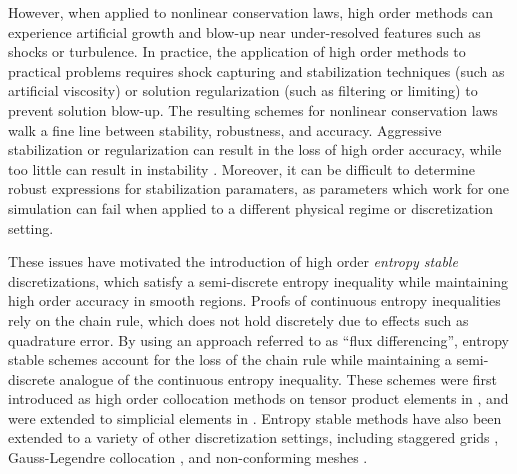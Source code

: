 \documentclass{svjour3}                     %
\begin{document}
However, when applied to nonlinear conservation laws, high order methods can experience artificial growth and blow-up near under-resolved features such as shocks or turbulence.  In practice, the application of high order methods to practical problems requires shock capturing and stabilization techniques (such as artificial viscosity) or solution regularization (such as filtering or limiting) to prevent solution blow-up.  The resulting schemes for nonlinear conservation laws walk a fine line between stability, robustness, and accuracy.  Aggressive stabilization or regularization can result in the loss of high order accuracy, while too little can result in instability \cite{wang2013high}.  Moreover, it can be difficult to determine robust expressions for stabilization paramaters, as parameters which work for one simulation can fail when applied to a different physical regime or discretization setting.  

These issues have motivated the introduction of high order \textit{entropy stable} discretizations, which satisfy a semi-discrete entropy inequality while maintaining high order accuracy in smooth regions.  Proofs of continuous entropy inequalities rely on the chain rule, which does not hold discretely due to effects such as quadrature error.   By using an approach referred to as ``flux differencing'', entropy stable schemes account for the loss of the chain rule while maintaining a semi-discrete analogue of the continuous entropy inequality.  These schemes were first introduced as high order collocation methods on tensor product elements in \cite{fisher2013high, carpenter2014entropy, gassner2016split, gassner2017br1}, and were extended to simplicial elements in \cite{crean2017high, chen2017entropy, crean2018entropy, chan2017discretely, chan2018discretely}.  Entropy stable methods have also been extended to a variety of other discretization settings, including staggered grids \cite{parsani2016entropy}, Gauss-Legendre collocation \cite{chan2018efficient}, and non-conforming meshes \cite{friedrich2017entropy}.  
\end{document}
